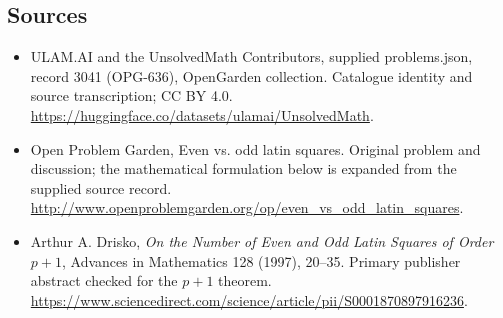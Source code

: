 \documentclass[11pt,a4paper]{article}
\begin{document}
\subsection{Sources}
\begin{itemize}
\item[S1] ULAM.AI and the UnsolvedMath Contributors, supplied problems.json, record 3041 (OPG-636), OpenGarden collection. Catalogue identity and source transcription; CC BY 4.0.
\url{https://huggingface.co/datasets/ulamai/UnsolvedMath}.
\item[S2] Open Problem Garden, Even vs. odd latin squares. Original problem and discussion; the mathematical formulation below is expanded from the supplied source record.
\url{http://www.openproblemgarden.org/op/even_vs_odd_latin_squares}.

\item[R1] Arthur A. Drisko, \emph{On the Number of Even and Odd Latin
Squares of Order $p+1$}, Advances in Mathematics 128 (1997), 20--35.
Primary publisher abstract checked for the $p+1$ theorem.
\url{https://www.sciencedirect.com/science/article/pii/S0001870897916236}.

\end{itemize}
\end{document}
